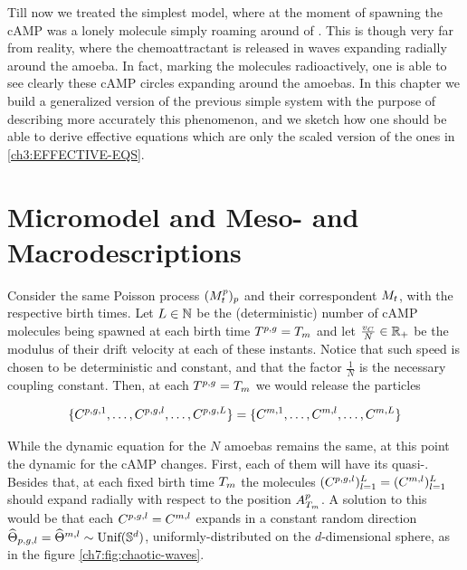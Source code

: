 \label{ch7}

Till now we treated the simplest model, where at the moment of spawning the cAMP was a lonely molecule simply roaming around of \Bm.
This is though very far from reality, where the chemoattractant is released in waves expanding radially around the amoeba.
In fact, marking the molecules radioactively, one is able to see clearly these cAMP circles expanding around the amoebas.
In this chapter we build a generalized version of the previous simple system with the purpose of describing more accurately this phenomenon, and we sketch how one should be able to derive effective equations which are only the scaled version of the ones in \ref{ch3:EFFECTIVE-EQS}.

\section{Micromodel and Meso- and Macrodescriptions}


Consider the same Poisson process $(M_t^p)_p$ and their correspondent $M_t$, with the respective birth times.
Let $L \in \mathbb{N}$ be the (deterministic) number of cAMP molecules being spawned at each birth time $T^{p,g}=T_m$ and let $\frac{v_C}{N} \in \mathbb{R}_+$ be the modulus of their drift velocity at each of these instants.
Notice that such speed is chosen to be deterministic and constant, and that the factor $\frac{1}{N}$ is the necessary coupling constant.
Then, at each $T^{p,g}=T_m$ we would release the particles

\begin{equation*}
	\{ C^{p,g,1}, \ldots, C^{p,g,l}, \ldots, C^{p,g,L}\} = \{ C^{m,1}, \ldots, C^{m,l},\ldots, C^{m,L}\} 
\end{equation*}

While the dynamic equation for the $N$ amoebas remains the same, at this point the dynamic for the cAMP changes.
First, each of them will have its quasi-\Bm.
Besides that, at each fixed birth time $T_m$ the molecules $(C^{p,g,l})_{l=1}^L = (C^{m,l})_{l=1}^L$ should expand radially with respect to the position $A_{T_m}^p$.
A solution to this would be that each $C^{p,g,l} = C^{m,l}$ expands in a constant random direction $\widehat{\Theta}_{p,g,l}=\widehat{\Theta}^{m,l} \sim \text{Unif}(\mathbb{S}^d)$, \ie uniformly-distributed on the $d$-dimensional sphere, as in the figure \ref{ch7:fig:chaotic-waves}.

